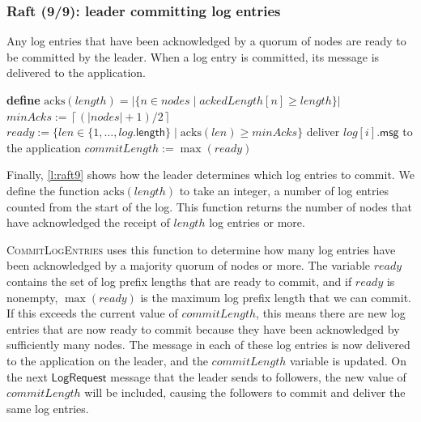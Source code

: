 \begin{frame}
    \label{s:raft9}
    \frametitle{Raft (9/9): leader committing log entries}
    \footnotesize
    Any log entries that have been acknowledged by a quorum of nodes are ready to be committed by the leader.
    When a log entry is committed, its message is delivered to the application.\\[1em]
    \begin{algorithmic}
        \State \textbf{define} $\mathrm{acks}(\mathit{length}) = |\{n \in \mathit{nodes} \mid \mathit{ackedLength}[n] \ge \mathit{length}\}|$
        \State
            \State $\mathit{minAcks} := \left\lceil (|\mathit{nodes}| + 1)/2 \right\rceil$
            \State $\mathit{ready} := \{\mathit{len} \in \{1,\dots,\mathit{log}.\mathsf{length}\} \mid \mathrm{acks}(\mathit{len}) \ge \mathit{minAcks}\}$
                    \State deliver $\mathit{log}[i].\mathsf{msg}$ to the application
                \EndFor
                \State $\mathit{commitLength} := \max(\mathit{ready})$
            \EndIf
        \EndFunction
        \State
    \end{algorithmic}
\end{frame}
\label{l:raft9}

Finally, \autoref{l:raft9} shows how the leader determines which log entries to commit.
We define the function $\mathrm{acks}(\mathit{length})$ to take an integer, a number of log entries counted from the start of the log.
This function returns the number of nodes that have acknowledged the receipt of $\mathit{length}$ log entries or more.

\textsc{CommitLogEntries} uses this function to determine how many log entries have been acknowledged by a majority quorum of nodes or more.
The variable $\mathit{ready}$ contains the set of log prefix lengths that are ready to commit, and if $\mathit{ready}$ is nonempty, $\max(\mathit{ready})$ is the maximum log prefix length that we can commit.
If this exceeds the current value of $\mathit{commitLength}$, this means there are new log entries that are now ready to commit because they have been acknowledged by sufficiently many nodes.
The message in each of these log entries is now delivered to the application on the leader, and the $\mathit{commitLength}$ variable is updated.
On the next $\mathsf{LogRequest}$ message that the leader sends to followers, the new value of $\mathit{commitLength}$ will be included, causing the followers to commit and deliver the same log entries.

